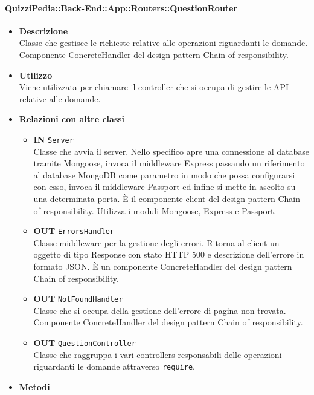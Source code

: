 \paragraph{QuizziPedia::Back-End::App::Routers::QuestionRouter}
	\begin{itemize}
		\item \textbf{Descrizione} \\
		Classe che gestisce le richieste relative alle operazioni riguardanti le domande. Componente ConcreteHandler del design pattern Chain of responsibility.
		\item \textbf{Utilizzo} \\
		Viene utilizzata per chiamare il controller che si occupa di gestire le API relative alle domande.
		\item \textbf{Relazioni con altre classi} \\
		\begin{itemize}
			\item \textbf{IN} \texttt{Server}\\
			Classe che avvia il server. Nello specifico apre una connessione al database tramite Mongoose, invoca il middleware Express passando un riferimento al database MongoDB come parametro in modo che possa configurarsi con esso, invoca il middleware Passport ed infine si mette in ascolto su una determinata porta. È il componente client del design pattern Chain of responsibility. Utilizza i moduli Mongoose, Express e Passport.
			\item \textbf{OUT} \texttt{ErrorsHandler}\\
			Classe middleware per la gestione degli errori. Ritorna al client un oggetto di tipo Response con stato HTTP 500 e descrizione dell'errore in formato JSON. È un componente ConcreteHandler del design pattern Chain of responsibility.
			\item \textbf{OUT} \texttt{NotFoundHandler}\\
			Classe che si occupa della gestione dell’errore di pagina non trovata. Componente ConcreteHandler del design pattern Chain of responsibility.
			\item \textbf{OUT} \texttt{QuestionController}\\
			Classe che raggruppa i vari controllers responsabili delle operazioni riguardanti le domande attraverso \texttt{require}.
		\end{itemize}
		\item \textbf{Metodi} \\
		\begin{itemize}

\end{itemize}
\end{itemize}

